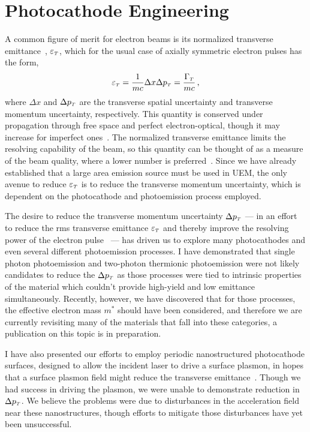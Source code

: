 \section{Photocathode Engineering}

A common figure of merit for electron beams is its normalized transverse emittance~\cite{jensen_emittance_2010}, $\varepsilon_{{\scriptscriptstyle T}}$, which for the usual case of axially symmetric electron pulses has the form,
\begin{equation}
  \varepsilon_{{\scriptscriptstyle T}} = \frac{1}{m c} \Delta x \Delta p_{{\scriptscriptstyle T}} = \frac{\Gamma_{{\scriptscriptstyle T}}}{m c} \,\text{,}
\end{equation}
where $\Delta x$ and $\Delta p_{{\scriptscriptstyle T}}$ are the transverse spatial uncertainty and transverse momentum uncertainty, respectively.
This quantity is conserved under propagation through free space and perfect electron-optical, though it may increase for imperfect ones~\cite{oshea_reversible_1998}.
The normalized transverse emittance limits the resolving capability of the beam, so this quantity can be thought of as a measure of the beam quality, where a lower number is preferred~\cite{berger_dc_2009}.
Since we have already established that a large area emission source must be used in UEM, the only avenue to reduce $\varepsilon_{{\scriptscriptstyle T}}$ is to reduce the transverse momentum uncertainty, which is dependent on the photocathode and photoemission process employed.

The desire to reduce the transverse momentum uncertainty $\Delta p_{{\scriptscriptstyle T}}$ --- in an effort to reduce the rms transverse emittance $\varepsilon_{{\scriptscriptstyle T}}$ and thereby improve the resolving power of the electron pulse~\cite{berger_dc_2009} --- has driven us to explore many photocathodes and even several different photoemission processes.
I have demonstrated that single photon photoemission and two-photon thermionic photoemission were not likely candidates to reduce the $\Delta p_{{\scriptscriptstyle T}}$ as those processes were tied to intrinsic properties of the material which couldn't provide high-yield and low emittance simultaneously.
Recently, however, we have discovered that for those processes, the effective electron mass $m^*$ should have been considered, and therefore we are currently revisiting many of the materials that fall into these categories, a publication on this topic is in preparation.

I have also presented our efforts to employ periodic nanostructured photocathode surfaces, designed to allow the incident laser to drive a surface plasmon, in hopes that a surface plasmon field might reduce the transverse emittance~\cite{zawadzka_evanescent_2001,kupersztych_ponderomotive_2001,kupersztych_anomalous_2005,li_surface_2013}.
Though we had success in driving the plasmon, we were unable to demonstrate reduction in $\Delta p_{{\scriptscriptstyle T}}$.
We believe the problems were due to disturbances in the acceleration field near these nanostructures, though efforts to mitigate those disturbances have yet been unsuccessful.


